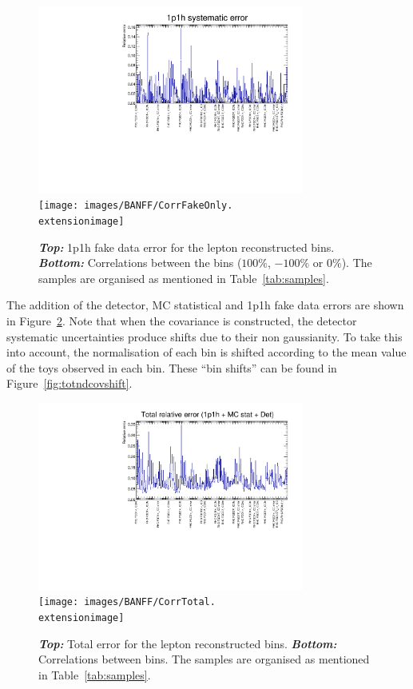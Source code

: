 \begin{figure}[ht]
  \center
  \includegraphics[width=0.78\textwidth]{images/BANFF/1p1h_fake_Error_redu.pdf} \\
  \texttt{[image: images/BANFF/CorrFakeOnly.\\extensionimage]}
  \caption[1p1h fake data error and correlations for the lepton
  reconstructed bins]{\textbf{\textit{Top:}} 1p1h fake data error for
    the lepton reconstructed bins. \textbf{\textit{Bottom:}}
    Correlations between the bins ($100\%$, $-100\%$ or $0\%$). The
    samples are organised as mentioned in Table~\ref{tab:samples}.}
  \label{fig:fakedataerror}
\end{figure}

The addition of the detector, \Gls{MC} statistical and 1p1h fake data
errors are shown in Figure~\ref{fig:totndcov}. Note that when the
covariance is constructed, the detector systematic uncertainties
produce shifts due to their non gaussianity. To take this into
account, the normalisation of each bin is shifted according to the
mean value of the toys observed in each bin. These ``bin shifts'' can
be found in Figure~\ref{fig:totndcovshift}.

\begin{figure}[ht]
  \center
  \includegraphics[width=0.78\textwidth]{images/BANFF/totalerr.pdf} \\
  \texttt{[image: images/BANFF/CorrTotal.\\extensionimage]}
  \caption[Total error and correlations for the lepton reconstructed
  bins]{\textbf{\textit{Top:}} Total error for the lepton
    reconstructed bins. \textbf{\textit{Bottom:}} Correlations between
    bins. The samples are organised as mentioned in
    Table~\ref{tab:samples}.}
  \label{fig:totndcov}
\end{figure}

